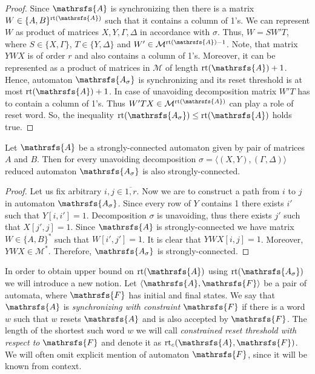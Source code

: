 \documentclass[11pt]{llncs}
\newcommand{\A}{\mathrsfs{A}}
\newcommand{\AD}{\mathrsfs{A_{\sigma}}}
\newcommand{\G}{\Gamma}
\newcommand{\D}{\Delta}
\newcommand{\rt}{\mathrm{rt}}
\newcommand{\rtc}{\mathrm{rt}_{c}}
\begin{document}
\begin{proof}
Since $\A$ is synchronizing then there is a matrix $W \in \{A, B\}^{\rt(\A)}$ such
that it contains a column of 1's. We can represent $W$ as product of matrices $X,Y,\G,\D$ in 
accordance with $\sigma$. Thus, $W = SW'T$, where $S \in \{X,\G\}$, $T \in \{Y,\D\}$ and $W' \in \mathcal{M}^{\rt(\A) - 1}$.
Note, that matrix $YWX$ is of order $r$ and also contains a column of 1's. Moreover, it can be represented
as a product of matrices in $\mathcal{M}$ of length $\rt(\A) + 1$. Hence, automaton $\AD$ is
synchronizing and its reset threshold is at most $\rt(\A) + 1$.
In case of unavoiding decomposition matrix $W'T$ has to contain a column of 1's.
Thus $W'TX \in \mathcal{M}^{\rt(\A)}$ can play a role of reset word. So, the inequality $\rt(\AD) \leq \rt(\A)$ holds true.
\end{proof}


\begin{proposition}
Let $\A$ be a strongly-connected automaton given by pair of matrices $A$ and $B$.
Then for every unavoiding decomposition $\sigma = \langle(X,Y),(\G,\D)\rangle$ reduced automaton $\AD$
is also strongly-connected.
\end{proposition}

\begin{proof}
Let us fix arbitrary $i,j \in \overline{1,r}$. Now we are to construct a path from $i$ to $j$ 
in automaton $\AD$. Since every row of $Y$ contains 1 there
exists $i'$ such that $Y[i,i'] = 1$. Decomposition $\sigma$ is unavoiding, thus
there exists $j'$ such that $X[j',j] = 1$. Since $\A$ is strongly-connected we have matrix 
$W \in \{A,B\}^*$ such that $W[i',j'] = 1$. It is clear that $YWX[i,j] = 1$. Moreover,
$YWX \in \mathcal{M}^*$. Therefore, $\AD$ is strongly-connected.
\end{proof}
In order to obtain upper bound on $\rt(\A)$ using $\rt(\AD)$ we will introduce a new notion.
Let $\langle \A , \mathrsfs{F} \rangle$ be a pair of automata, where $\mathrsfs{F}$ has initial and final states. 
We say that $\A$ is \emph{synchronizing with constraint} $\mathrsfs{F}$ if there is a word $w$ such that
$w$ resets $\A$ and is also accepted by $\mathrsfs{F}$. The length of the shortest such
word $w$ we will call \emph{constrained reset threshold with respect to} $\mathrsfs{F}$ and denote it as $\rtc(\A, \mathrsfs{F})$.
We will often omit explicit mention of automaton $\mathrsfs{F}$, since it will be known from context.
\end{document}

